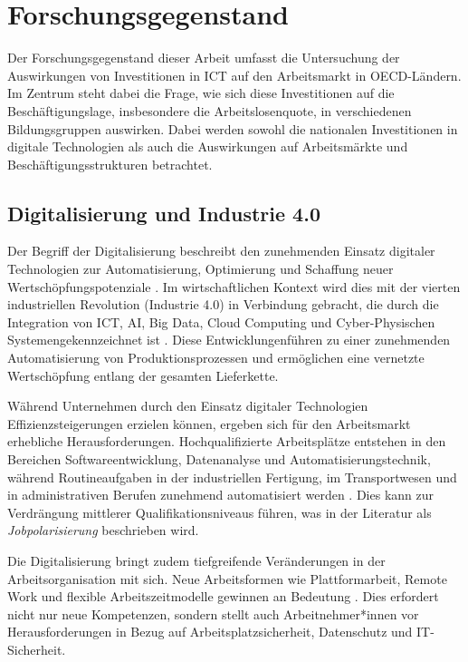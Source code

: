 \section{Forschungsgegenstand}

Der Forschungsgegenstand dieser Arbeit umfasst die Untersuchung der Auswirkungen von 
Investitionen in \ac{ICT} auf den Arbeitsmarkt in \ac{OECD}-Ländern. Im Zentrum steht 
dabei die Frage, wie sich diese Investitionen auf die Beschäftigungslage, insbesondere 
die Arbeitslosenquote, in verschiedenen Bildungsgruppen auswirken. Dabei werden sowohl 
die nationalen Investitionen in digitale Technologien als auch die Auswirkungen auf 
Arbeitsmärkte und Beschäftigungsstrukturen betrachtet.


\subsection{Digitalisierung und Industrie 4.0}

Der Begriff der Digitalisierung beschreibt den zunehmenden Einsatz digitaler Technologien
zur Automatisierung, Optimierung und Schaffung neuer Wertschöpfungspotenziale
\parencite[vgl.][S. 6]{brennen2016theinternational}. Im wirtschaftlichen Kontext wird 
dies mit der vierten industriellen Revolution (Industrie 4.0) in Verbindung gebracht, die 
durch die Integration von \ac{ICT}, \ac{AI}, Big Data, Cloud Computing und 
Cyber-Physischen Systemengekennzeichnet ist 
\parencite[vgl.][S. 22]{kagermann2013recommendations}. Diese Entwicklungenführen zu einer 
zunehmenden Automatisierung von Produktionsprozessen und ermöglichen eine vernetzte 
Wertschöpfung entlang der gesamten Lieferkette.

Während Unternehmen durch den Einsatz digitaler Technologien Effizienzsteigerungen 
erzielen können, ergeben sich für den Arbeitsmarkt erhebliche Herausforderungen. 
Hochqualifizierte Arbeitsplätze entstehen in den Bereichen Softwareentwicklung, 
Datenanalyse und Automatisierungstechnik, während Routineaufgaben in der industriellen 
Fertigung, im Transportwesen und in administrativen Berufen zunehmend automatisiert 
werden \parencite[vgl.][S. 40]{frey2013thefuture}. Dies kann zur Verdrängung mittlerer
Qualifikationsniveaus führen, was in der Literatur als \textit{Jobpolarisierung} 
beschrieben wird.

Die Digitalisierung bringt zudem tiefgreifende Veränderungen in der Arbeitsorganisation
mit sich. Neue Arbeitsformen wie Plattformarbeit, Remote Work und flexible
Arbeitszeitmodelle gewinnen an Bedeutung \parencite[vgl.][S. 112]{schwab2016thefourth}.
Dies erfordert nicht nur neue Kompetenzen, sondern stellt auch Arbeitnehmer*innen vor
Herausforderungen in Bezug auf Arbeitsplatzsicherheit, Datenschutz und IT-Sicherheit.

